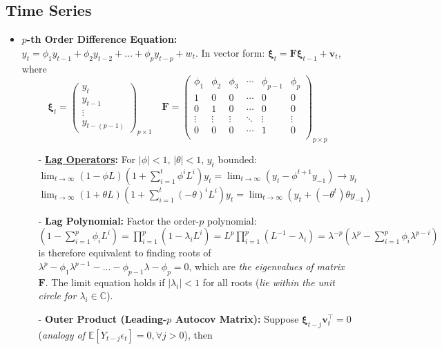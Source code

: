 \documentclass[9pt, landscape]{article}
\begin{document}
\begin{multicols*}{3}
\section{Time Series}
\begin{itemize}
	\item \textbf{$p$-th Order Difference Equation:} $y_t = \phi_1 y_{t-1} + \phi_2 y_{t-2} + ... + \phi_p y_{t-p} + w_t$. In vector form: $\bm{\xi}_t = \bm{F} \bm{\xi}_{t-1} + \bm{v}_t$, where
	{\scriptsize$$
	\bm{\xi}_t = \begin{pmatrix}
		y_t \\
		y_{t-1} \\
		\vdots \\
		y_{t-(p-1)}
	\end{pmatrix}_{p\times 1} \quad \bm{F} = \begin{pmatrix}
		\phi_1 & \phi_2 & \phi_3 & \cdots & \phi_{p-1} & \phi_p \\
		1 & 0 & 0 & \cdots & 0 & 0 \\
		0 & 1 & 0 & \cdots & 0 & 0 \\
		\vdots & \vdots & \vdots & \ddots &  \vdots & \vdots \\
		0 & 0 & 0 & \cdots & 1 & 0 \\
	\end{pmatrix}_{p\times p}
	$$}
	\begin{itemize}[leftmargin=10pt,noitemsep,topsep=0pt,partopsep=0pt]
		\item[-] \textbf{\href{https://en.wikipedia.org/wiki/Lag_operator}{Lag Operators}:} For $|\phi|<1$, $|\theta|<1$, $y_t$ bounded:\\
		$\lim_{t\rightarrow\infty} (1-\phi L)(1 + \textstyle\sum_{i=1}^t\phi^i L^i) y_t = \lim_{t\rightarrow\infty} (y_t - \phi^{t+1} y_{-1}) \to y_t$ \\
		$\lim_{t\rightarrow\infty} (1+\theta L)(1 + \textstyle\sum_{i=1}^t(-\theta)^i L^i) y_t = \lim_{t\rightarrow\infty} (y_t + (-\theta^{t})\theta y_{-1})$
		\item[-] \textbf{Lag Polynomial:} Factor the order-$p$ polynomial: $(1-\sum_{i=1}^p\phi_i L^i) = \prod_{i=1}^p (1- \lambda_i L^i) = L^p \prod_{i=1}^p (L^{-1} - \lambda_i) = \lambda^{-p}(\lambda^p - \sum_{i=1}^p \phi_i \lambda^{p-i})$ is therefore equivalent to finding roots of $\lambda^p - \phi_1 \lambda^{p-1} - ... - \phi_{p-1} \lambda - \phi_p = 0$, which are \textit{the eigenvalues of matrix $\bm{F}$}. The limit equation holds if $|\lambda_i| < 1$ for all roots (\textit{lie within the unit circle for $\lambda_i \in \mathbb{C}$}).
		\item[-]\label{item:leadingp_acov} \textbf{Outer Product (Leading-$p$ Autocov Matrix):} Suppose $\bm{\xi}_{t-j} \bm{v}_t^{\top} = 0$ (\textit{analogy of $\mathbb{E}\left[Y_{t-j} \epsilon_t \right] = 0, \forall j > 0$}), then \\

\end{itemize}
\end{itemize}
\end{multicols*}
\end{document}

